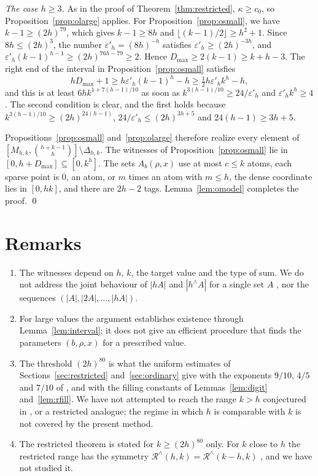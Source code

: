 \documentclass[11pt]{amsart}
\theoremstyle{definition}
\theoremstyle{remark}
\numberwithin{equation}{section}
\newcommand{\Rr}{\mathcal{R}^{\wedge}}
\newcommand{\res}[2]{#1^{\wedge}#2}
\begin{document}
\emph{The case $h\ge 3$.} As in the proof of Theorem~\ref{thm:restricted}, $\kappa\ge c_0$, so Proposition~\ref{prop:olarge} applies. For Proposition~\ref{prop:osmall}, we have $k-1\ge(2h)^{79}$, which gives $k-1\ge 8h$ and $\lfloor(k-1)/2\rfloor\ge h^2+1$. Since $8h\le(2h)^3$, the number $\varepsilon'_h=(8h)^{-h}$ satisfies $\varepsilon'_h\ge(2h)^{-3h}$, and $\varepsilon'_h(k-1)^{h-1}\ge(2h)^{76h-79}\ge 2$. Hence $D_{\max}\ge 2(k-1)\ge k+h-3$. The right end of the interval in Proposition~\ref{prop:osmall} satisfies
\[
hD_{\max}+1\ge h\varepsilon'_h(k-1)^h-h\ge\tfrac12h\varepsilon'_hk^h-h,
\]
and this is at least $6hk^{1+7(h-1)/10}$ as soon as $k^{3(h-1)/10}\ge 24/\varepsilon'_h$ and $\varepsilon'_hk^h\ge 4$. The second condition is clear, and the first holds because $k^{3(h-1)/10}\ge(2h)^{24(h-1)}$, $24/\varepsilon'_h\le(2h)^{3h+5}$ and $24(h-1)\ge 3h+5$.

Propositions~\ref{prop:osmall} and~\ref{prop:olarge} therefore realize every element of $[M_{h,k},\binom{h+k-1}h]\setminus\Delta_{h,k}$. The witnesses of Proposition~\ref{prop:osmall} lie in $[0,h+D_{\max}]\subseteq[0,k^h]$. The sets $A_b(\rho,x)$ use at most $c\le k$ atoms, each sparse point is $0$, an atom, or $m$ times an atom with $m\le h$, the dense coordinate lies in $[0,hk]$, and there are $2h-2$ tags. Lemma~\ref{lem:omodel} completes the proof. \qed

\section{Remarks}\label{sec:remarks}

\begin{enumerate}[label=\textup{(\arabic*)},leftmargin=2em]
\item The witnesses depend on $h$, $k$, the target value and the type of sum. We do not address the joint behaviour of $|hA|$ and $|\res hA|$ for a single set $A$ \cite[Problem~18]{Nat25}, nor the sequences $(|A|,|2A|,\dots,|hA|)$.
\item For large values the argument establishes existence through Lemma~\ref{lem:interval}; it does not give an efficient procedure that finds the parameters $(b,\rho,x)$ for a prescribed value.
\item The threshold $(2h)^{80}$ is what the uniform estimates of Sections~\ref{sec:restricted} and~\ref{sec:ordinary} give with the exponents $9/10$, $4/5$ and $7/10$ of \cite[Section~4.3]{Raj26}, and with the filling constants of Lemmas~\ref{lem:digit} and~\ref{lem:rfill}. We have not attempted to reach the range $k>h$ conjectured in \cite[Conjecture~1.6]{Raj26}, or a restricted analogue; the regime in which $h$ is comparable with $k$ is not covered by the present method.
\item The restricted theorem is stated for $k\ge(2h)^{80}$ only. For $k$ close to $h$ the restricted range has the symmetry $\Rr(h,k)=\Rr(k-h,k)$ \cite[Equation~(1)]{Nat25}, and we have not studied it.
\end{enumerate}
\end{document}
